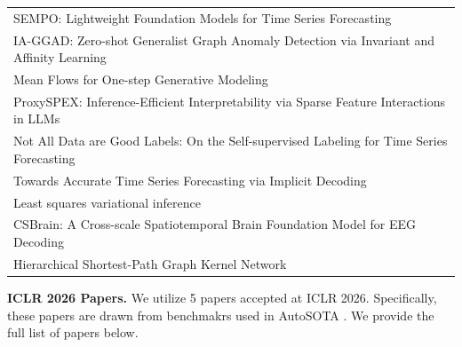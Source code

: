 \begin{table}[h]
{\begin{tabular}{l}
SEMPO: Lightweight Foundation Models for Time Series Forecasting \citep{he2025sempo}\\
IA-GGAD: Zero-shot Generalist Graph Anomaly Detection via Invariant and Affinity Learning \citep{zhang2025iaggad}\\
Mean Flows for One-step Generative Modeling \citep{geng2025mean}\\
ProxySPEX: Inference-Efficient Interpretability via Sparse Feature Interactions in LLMs \citep{butler2025proxyspex}\\
Not All Data are Good Labels: On the Self-supervised Labeling for Time Series Forecasting \citep{yang2025not}\\
Towards Accurate Time Series Forecasting via Implicit Decoding \citep{li2025towards}\\
Least squares variational inference \citep{fay2025least}\\
CSBrain: A Cross-scale Spatiotemporal Brain Foundation Model for EEG Decoding \citep{zhou2025csbrain}\\
Hierarchical Shortest-Path Graph Kernel Network \citep{wang2025hierarchical}\\
\bottomrule
\end{tabular}}
\end{table}

\noindent\textbf{ICLR 2026 Papers.} We utilize 5 papers accepted at ICLR 2026. Specifically, these papers are drawn from benchmakrs used in AutoSOTA \citep{li2026autosota}. We provide the full list of papers below.

\begin{table}[h]
\centering
\caption{\textbf{ICLR 2026 Papers.} We utilize 5 accepted papers.}\label{tab:iclr}
\end{table}

